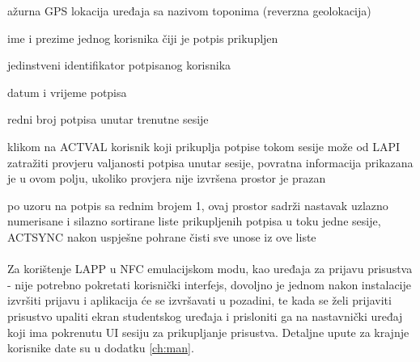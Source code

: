 \begin{description}[noitemsep,align=right,labelwidth=2cm]
    \item [\#1] ažurna GPS lokacija uređaja sa nazivom toponima (reverzna geolokacija)
    \item [\#2] ime i prezime jednog korisnika čiji je potpis prikupljen
    \item [\#3] jedinstveni identifikator potpisanog korisnika
    \item [\#4] datum i vrijeme potpisa
    \item [\#5] redni broj potpisa unutar trenutne sesije
    \item [\#6] klikom na ACTVAL korisnik koji prikuplja potpise tokom sesije može od LAPI zatražiti provjeru valjanosti potpisa unutar sesije, povratna informacija prikazana je u ovom polju, ukoliko provjera nije izvršena prostor je prazan
    \item [\#7] po uzoru na potpis sa rednim brojem 1, ovaj prostor sadrži nastavak uzlazno numerisane i silazno sortirane liste prikupljenih potpisa u toku jedne sesije, ACTSYNC nakon uspješne pohrane čisti sve unose iz ove liste
\end{description}

\paragraph*{}
Za korištenje LAPP u NFC emulacijskom modu, kao uređaja za prijavu prisustva - nije potrebno pokretati korisnički interfejs, dovoljno je jednom nakon instalacije izvršiti prijavu i aplikacija će se izvršavati u pozadini, te kada se želi prijaviti prisustvo upaliti ekran studentskog uređaja i prisloniti ga na nastavnički uređaj koji ima pokrenutu UI sesiju za prikupljanje prisustva. Detaljne upute za krajnje korisnike date su u dodatku \ref{ch:man}.